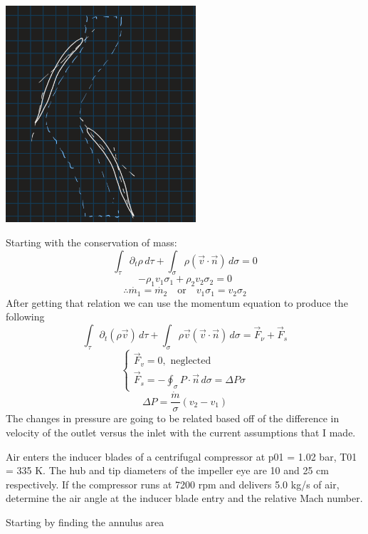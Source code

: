 \documentclass[12pt]{exam}
\begin{document}
\begin{questions}
\begin{solutionorbox}[\stretch{1}]
\begin{center}
\includegraphics[width=200pt]{Compressor control volume.png}
\end{center}
Starting with the conservation of mass:
\[\int_{\tau} \partial_t \rho \, d\tau + \int_{\sigma} \rho (\vec{v} \cdot \vec{n}) \, d\sigma = 0\]
\[-\rho_1 v_1 \sigma_1 + \rho_2 v_2 \sigma_2 = 0\]
\[\therefore \dot{m_1} = \dot{m_2} \quad \text{or} \quad v_1 \sigma_1 = v_2 \sigma_2\]
After getting that relation we can use the momentum equation to produce the following
\[\int_{\tau} \partial_t (\rho \vec{v}) \, d\tau + \int_{\sigma} \rho \vec{v} (\vec{v} \cdot \vec{n}) \, d\sigma = \vec{F}_\nu + \vec{F}_s\]
\[
\begin{cases}
  \vec{F}_v = 0, \text{ neglected} \\
  \vec{F}_s = - \oint_{\sigma} P \cdot \vec{n} \, d\sigma = \Delta P \sigma
\end{cases}
\]
\[\Delta{P} = \frac{\dot{m}}{\sigma}\left(v_2-v_1\right)\]
The changes in pressure are going to be related based off of the difference in velocity
of the outlet versus the inlet with the current assumptions that I made.
\end{solutionorbox}


\newpage 
\begin{question}
Air enters the inducer blades of a centrifugal compressor at p01 = 1.02 bar, T01 = 335 K. The
hub and tip diameters of the impeller eye are 10 and 25 cm respectively. If the compressor
runs at 7200 rpm and delivers 5.0 kg/s of air, determine the air angle at the inducer blade
entry and the relative Mach number. 
\end{question}
\begin{solutionorbox}[\stretch{1}]
Starting by finding the annulus area


\end{solutionorbox}
\end{questions}
\end{document}
